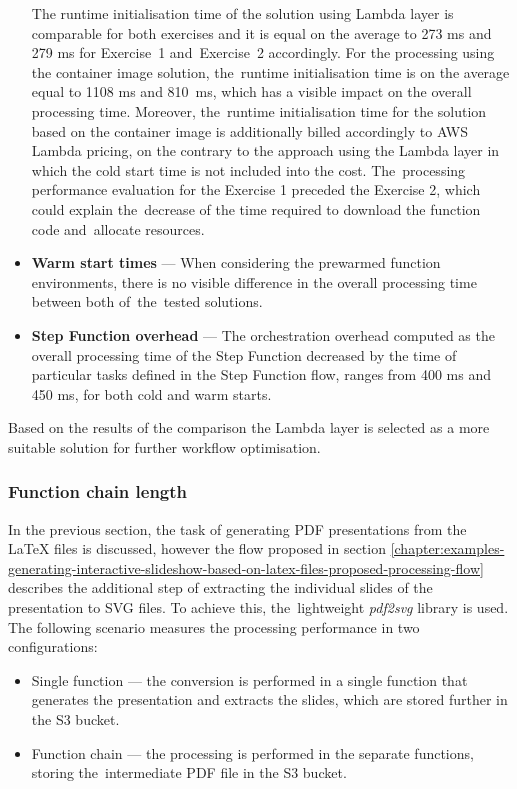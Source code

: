 \begin{itemize}
    The runtime initialisation time of the solution using Lambda layer is comparable for both exercises and it is equal on the average to 273 ms and 279 ms for Exercise~1 and~Exercise~2 accordingly. 
    For the processing using the container image solution, the~runtime initialisation time is on the average equal to 1108 ms and 810~ms, which has a visible impact on the overall processing time. Moreover, the~runtime initialisation time for the solution based on the container image is additionally billed accordingly to AWS Lambda pricing, on the contrary to the approach using the Lambda layer in which the cold start time is not included into the cost.
    The~processing performance evaluation for the Exercise 1 preceded the Exercise 2, which could explain the~decrease of the time required to download the function code and~allocate resources.
    \item \textbf{Warm start times} --- When considering the prewarmed function environments, there is no visible difference in the overall processing time between both of~the~tested solutions.
    \item \textbf{Step Function overhead} --- The orchestration overhead computed as the overall processing time of the Step Function decreased by the time of particular tasks defined in the Step Function flow, ranges from 400 ms and 450 ms, for both cold and warm starts.    
\end{itemize}

Based on the results of the comparison the Lambda layer is selected as a more suitable solution for further workflow optimisation.

\subsubsection{Function chain length}

In the previous section, the task of generating PDF presentations from the LaTeX files is discussed, however the flow proposed in section \ref{chapter:examples-generating-interactive-slideshow-based-on-latex-files-proposed-processing-flow} describes the additional step of extracting the individual slides of the presentation to SVG files. To achieve this, the~lightweight \textit{pdf2svg} \cite{pdf2svg} library is used. The following scenario measures the processing performance in two configurations:

\begin{itemize}
   \item Single function --- the conversion is performed in a single function that generates the presentation and extracts the slides, which are stored further in the S3 bucket.
   \item Function chain --- the processing is performed in the separate functions, storing the~intermediate PDF file in the S3 bucket.
\end{itemize}


